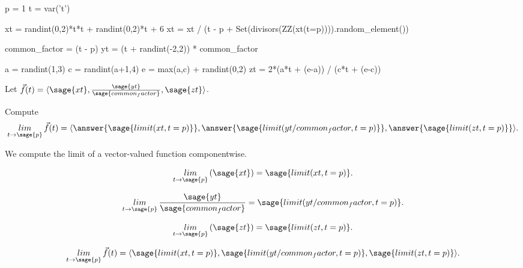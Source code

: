 \documentclass{ximera}
\author{Jim Fowler}
\begin{document}
\makerandom

\begin{sagesilent}
  p = 1
  t = var('t')
  
  xt = randint(0,2)*t*t + randint(0,2)*t + 6
  xt = xt / (t - p + Set(divisors(ZZ(xt(t=p)))).random_element())

  common_factor = (t - p)
  yt = (t + randint(-2,2)) * common_factor

  a = randint(1,3)
  c = randint(a+1,4)
  e = max(a,c) + randint(0,2)
  zt = 2*(a*t + (e-a)) / (c*t + (e-c))
\end{sagesilent}

\begin{exercise}

  Let $\vec{f}(t) = \langle \sage{xt}, \frac{\sage{yt}}{\sage{common_factor}}, \sage{zt} \rangle$.

  Compute
  \[
    \mathop{lim}_{t \to \sage{p}} \vec{f}(t) = \langle \answer{\sage{limit(xt,t=p)}}, \answer{\sage{limit(yt/common_factor,t=p)}}, \answer{\sage{limit(zt,t=p)}} \rangle.
  \]
  
  \begin{hint}
    We compute the limit of a vector-valued function componentwise.
  \end{hint}

  \begin{hint}
    \[\mathop{lim}_{t \to \sage{p}} \left( \sage{xt} \right) = \sage{limit(xt,t=p)}.\]
  \end{hint}

  \begin{hint}
    \[\mathop{lim}_{t \to \sage{p}} \frac{\sage{yt}}{\sage{common_factor}} = \sage{limit(yt/common_factor,t=p)}.\]
  \end{hint}

  \begin{hint}
    \[\mathop{lim}_{t \to \sage{p}} \left( \sage{zt} \right) = \sage{limit(zt,t=p)}.\]
  \end{hint}
  
  \begin{hint}
    \[\mathop{lim}_{t \to \sage{p}} \vec{f}(t) = \langle \sage{limit(xt,t=p)}, \sage{limit(yt/common_factor,t=p)}, \sage{limit(zt,t=p)} \rangle.\]
  \end{hint}          
  
\end{exercise}
\end{document}

